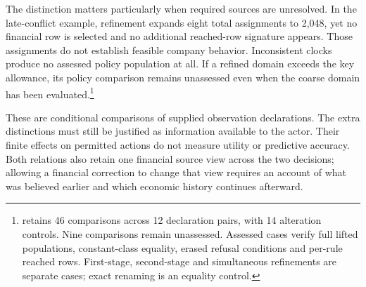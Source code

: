 The distinction matters particularly when required sources are unresolved. In the late-conflict example, refinement expands eight total assignments to 2,048, yet no financial row is selected and no additional reached-row signature appears. Those assignments do not establish feasible company behavior. Inconsistent clocks produce no assessed policy population at all. If a refined domain exceeds the key allowance, its policy comparison remains unassessed even when the coarse domain has been evaluated.\footnote{ retains 46 comparisons across 12 declaration pairs, with 14 alteration controls. Nine comparisons remain unassessed. Assessed cases verify full lifted populations, constant-class equality, erased refusal conditions and per-rule reached rows. First-stage, second-stage and simultaneous refinements are separate cases; exact renaming is an equality control.}

These are conditional comparisons of supplied observation declarations. The extra distinctions must still be justified as information available to the actor. Their finite effects on permitted actions do not measure utility or predictive accuracy. Both relations also retain one financial source view across the two decisions; allowing a financial correction to change that view requires an account of what was believed earlier and which economic history continues afterward.
